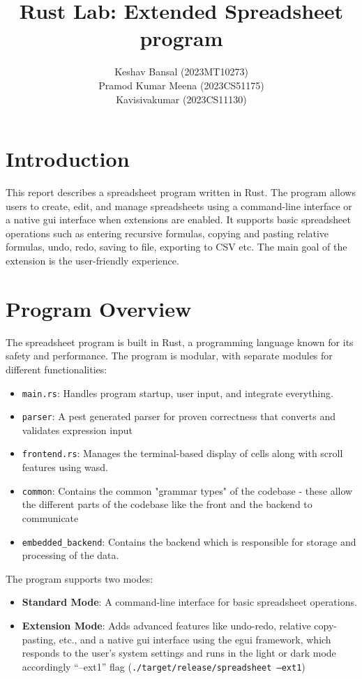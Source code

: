 \documentclass[12pt]{article}
\title{Rust Lab: Extended Spreadsheet program}
\author{Keshav Bansal (2023MT10273) \\ Pramod Kumar Meena (2023CS51175) \\ Kavisivakumar (2023CS11130)}
\date{}
\begin{document}
\maketitle
\tableofcontents

\section{Introduction}
This report describes a spreadsheet program written in Rust. The program allows users
to create, edit, and manage spreadsheets using a command-line interface or a native gui interface when extensions are enabled. It supports basic spreadsheet operations such as entering recursive
formulas, copying and pasting relative formulas, undo, redo, saving to file, exporting to CSV etc. The main goal of the extension is the user-friendly experience. 

\section{Program Overview}
The spreadsheet program is built in Rust, a programming language known for its safety
and performance. The program is modular, with separate modules for different functionalities:
\begin{itemize}
\item \texttt{main.rs}: Handles program startup, user input, and integrate everything.
\item \texttt{parser}: A pest generated parser for proven correctness that converts and validates expression input
\item \texttt{frontend.rs}: Manages the terminal-based display of cells along with scroll features using wasd.
\item \texttt{common}: Contains the common "grammar types" of the codebase - these allow the different parts of the codebase like the front and the backend to communicate
\item \texttt{embedded\_backend}: Contains the backend which is responsible for storage and processing of the data.
\end{itemize}

The program supports two modes:
\begin{itemize}
\item \textbf{Standard Mode}: A command-line interface for basic spreadsheet operations.
\item \textbf{Extension Mode}: Adds advanced features like undo-redo, relative copy-pasting, etc., and a native gui interface using the egui framework, which responds to the user's system settings and runs in the light or dark mode accordingly
``--ext1'' flag (\texttt{./target/release/spreadsheet --ext1})
\end{itemize}
\end{document}

